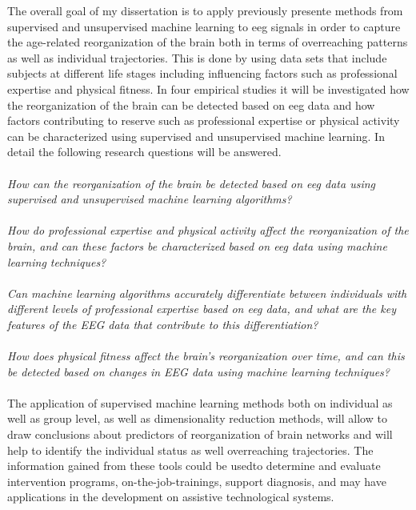 The overall goal of my dissertation is to apply previously presente methods from supervised and unsupervised machine learning to \gls{eeg} signals in order to capture the age-related reorganization of the brain both in terms of overreaching patterns as well as individual trajectories. This is done by using data sets that include subjects at different life stages including influencing factors such as professional expertise and physical fitness. In four empirical studies it will be investigated how the reorganization of the brain can be detected based on \gls{eeg} data and how factors contributing to reserve such as professional expertise or physical activity can be characterized using supervised and unsupervised machine learning. In detail the following research questions will be answered.\\
\\
\textit{How can the reorganization of the brain be detected based on \gls{eeg} data using supervised and unsupervised machine learning algorithms?}\\
\\
\textit{How do professional expertise and physical activity affect the reorganization of the brain, and can these factors be characterized based on \gls{eeg} data using machine learning techniques?}\\
\\
\textit{Can machine learning algorithms accurately differentiate between individuals with different levels of professional expertise based on \gls{eeg} data, and what are the key features of the EEG data that contribute to this differentiation?}\\
\\
\textit{How does physical fitness affect the brain's reorganization over time, and can this be detected based on changes in EEG data using machine learning techniques?}\\
\\
The application of supervised machine learning methods both on individual as well as group level, as well as dimensionality reduction methods, will allow to draw conclusions about predictors of reorganization of brain networks and will help to identify the individual status as well overreaching trajectories. The information gained from these tools could be usedto determine and evaluate intervention programs, on-the-job-trainings, support diagnosis, and may have applications in the development on assistive technological systems. 